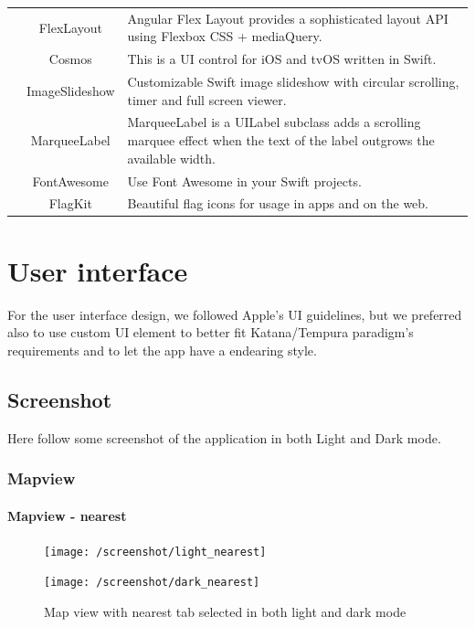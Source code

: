\documentclass[a4paper, 11pt, parskip=half]{scrreprt}
\theoremstyle{definition}
\begin{document}
\begin{table}[h]
\begin{tabular}{|c|c|m{9cm}|}
        & FlexLayout & Angular Flex Layout provides a sophisticated layout API using Flexbox CSS + mediaQuery. \\ \cline{2-3}
        & Cosmos & This is a UI control for iOS and tvOS written in Swift. \\ \cline{2-3}
        & ImageSlideshow & Customizable Swift image slideshow with circular scrolling, timer and full screen viewer. \\ \cline{2-3}
        & MarqueeLabel & MarqueeLabel is a UILabel subclass adds a scrolling marquee effect when the text of the label outgrows the available width. \\ \cline{2-3}
        & FontAwesome & Use Font Awesome in your Swift projects. \\ \cline{2-3}
        & FlagKit & Beautiful flag icons for usage in apps and on the web. \\ \hline
    \end{tabular}
\end{table}

\chapter{User interface}
For the user interface design, we followed Apple's UI guidelines, but we preferred also to use custom UI element to better fit Katana/Tempura paradigm's requirements and to let the app have a endearing style.  

\section{Screenshot}
Here follow some screenshot of the application in both Light and Dark mode.

\subsection{Mapview}
\subsubsection{Mapview - nearest}
\begin{figure}[H]
	\centering
	\begin{minipage}{.5\textwidth}
  	\centering
  	\texttt{[image: /screenshot/light\_nearest]}
  	\label{fig:test1}
	\end{minipage}%
	\begin{minipage}{.5\textwidth}
  	\centering
  	\texttt{[image: /screenshot/dark\_nearest]}
  	\label{fig:test2}
	\end{minipage}
	\caption{Map view with nearest tab selected in both light and dark mode}
\end{figure}
\end{document}
